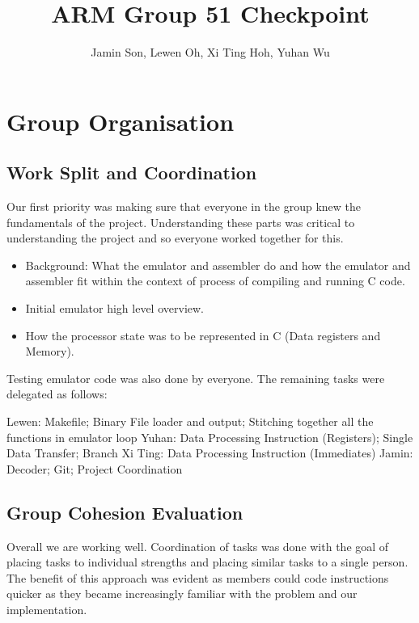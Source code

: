 \documentclass[11pt]{article}
\begin{document}
\title{ARM Group 51 Checkpoint}
\author{Jamin Son, Lewen Oh, Xi Ting Hoh, Yuhan Wu}

\maketitle

\section{Group Organisation}

\subsection{Work Split and Coordination}

Our first priority was making sure that everyone in the group knew the fundamentals of the project. Understanding these parts was critical to understanding the project and so everyone worked together for this.

\begin{itemize}
        \item Background: What the emulator and assembler do and how the emulator and assembler fit within the context of process of compiling and running C code.
        \item Initial emulator high level overview.
        \item How the processor state was to be represented in C (Data registers and Memory).
\end{itemize}

Testing emulator code was also done by everyone. The remaining tasks were delegated as follows:

Lewen: Makefile; Binary File loader and output; Stitching together all the functions in emulator loop \newline
Yuhan: Data Processing Instruction (Registers); Single Data Transfer; Branch \newline
Xi Ting: Data Processing Instruction (Immediates)\newline
Jamin: Decoder; Git; Project Coordination

\subsection{Group Cohesion Evaluation}
Overall we are working well. Coordination of tasks was done with the goal of placing tasks to individual strengths and placing similar tasks to a single person. The benefit of this approach was evident as members could code instructions quicker as they became increasingly familiar with the problem and our implementation.
\end{document}
